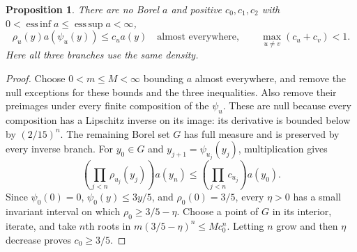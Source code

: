 \documentclass[11pt,reqno]{amsart}
\numberwithin{equation}{section}
\newtheorem{proposition}[theorem]{Proposition}
\theoremstyle{definition}
\begin{document}
\begin{proposition}\label{prop:bounded-density}
There are no Borel $a$ and positive $c_0,c_1,c_2$ with
$0<\operatorname*{ess\,inf}a\le\operatorname*{ess\,sup}a<\infty$,
\[
 \rho_u(y)a(\psi_u(y))\le c_u a(y)\quad\text{almost everywhere},
 \qquad\max_{u\ne v}(c_u+c_v)<1.
\]
Here all three branches use the same density.
\end{proposition}
\begin{proof}
Choose $0<m\le M<\infty$ bounding $a$ almost everywhere, and
remove the null exceptions for these bounds and the three inequalities.
Also remove their preimages under every finite composition of the
$\psi_u$. These are null because every composition has a Lipschitz
inverse on its image: its derivative is bounded below by
$(2/15)^n$. The remaining Borel set $G$ has full measure and is
preserved by every inverse branch. For $y_0\in G$ and
$y_{j+1}=\psi_{u_j}(y_j)$, multiplication gives
\begin{equation}\label{eq:density-iterate}
 \left(\prod_{j<n}\rho_{u_j}(y_j)\right)a(y_n)
 \le\left(\prod_{j<n}c_{u_j}\right)a(y_0).
\end{equation}
Since $\psi_0(0)=0$, $\psi_0(y)\le3y/5$, and
$\rho_0(0)=3/5$, every $\eta>0$ has a small invariant interval
on which $\rho_0\ge3/5-\eta$. Choose a point of $G$ in its
interior, iterate, and take $n$th roots in
$m(3/5-\eta)^n\le Mc_0^n$. Letting $n$ grow and then
$\eta$ decrease proves $c_0\ge3/5$.


\end{proof}
\end{document}
